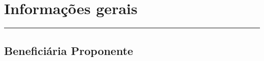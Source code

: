 \documentclass[a4paper,12pt]{article}
\begin{document}
\section{Informações gerais}
\vspace{-0.8cm} %
\noindent %
\rule{\textwidth}{2pt} %


    
\subsection{Beneficiária Proponente}
\vspace{-1cm} %
\end{document}
